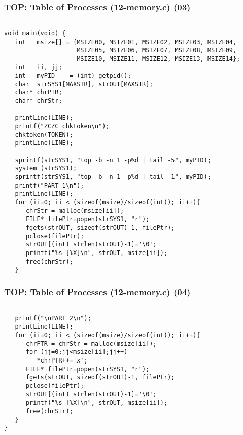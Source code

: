 \documentclass[aspectratio=169, xcolor=table, notheorems, hyperref={pdfpagelabels=false}]{beamer}
\begin{document}
\begin{frame}[fragile]
\frametitle{TOP: Table of Processes (12-memory.c) (03)}
\begin{lstlisting}[basicstyle=\ttfamily\tiny]

void main(void) {
   int   msize[] = {MSIZE00, MSIZE01, MSIZE02, MSIZE03, MSIZE04, 
                    MSIZE05, MSIZE06, MSIZE07, MSIZE08, MSIZE09,
                    MSIZE10, MSIZE11, MSIZE12, MSIZE13, MSIZE14};
   int   ii, jj;
   int   myPID    = (int) getpid();
   char  strSYS1[MAXSTR], strOUT[MAXSTR];
   char* chrPTR; 
   char* chrStr;

   printLine(LINE);
   printf("ZCZC chktoken\n");
   chktoken(TOKEN);
   printLine(LINE);

   sprintf(strSYS1, "top -b -n 1 -p%d | tail -5", myPID);
   system (strSYS1);
   sprintf(strSYS1, "top -b -n 1 -p%d | tail -1", myPID);
   printf("PART 1\n");
   printLine(LINE);
   for (ii=0; ii < (sizeof(msize)/sizeof(int)); ii++){
      chrStr = malloc(msize[ii]);
      FILE* filePtr=popen(strSYS1, "r");
      fgets(strOUT, sizeof(strOUT)-1, filePtr);
      pclose(filePtr);
      strOUT[(int) strlen(strOUT)-1]='\0';
      printf("%s [%X]\n", strOUT, msize[ii]);
      free(chrStr);
   }

\end{lstlisting}
\end{frame}

\begin{frame}[fragile]
\frametitle{TOP: Table of Processes (12-memory.c) (04)}
\begin{lstlisting}[basicstyle=\ttfamily\footnotesize]

   printf("\nPART 2\n");
   printLine(LINE);
   for (ii=0; ii < (sizeof(msize)/sizeof(int)); ii++){
      chrPTR = chrStr = malloc(msize[ii]);
      for (jj=0;jj<msize[ii];jj++)
         *chrPTR++='x';
      FILE* filePtr=popen(strSYS1, "r");
      fgets(strOUT, sizeof(strOUT)-1, filePtr);
      pclose(filePtr);
      strOUT[(int) strlen(strOUT)-1]='\0';
      printf("%s [%X]\n", strOUT, msize[ii]);
      free(chrStr);
   }
}

\end{lstlisting}
\end{frame}
\end{document}

